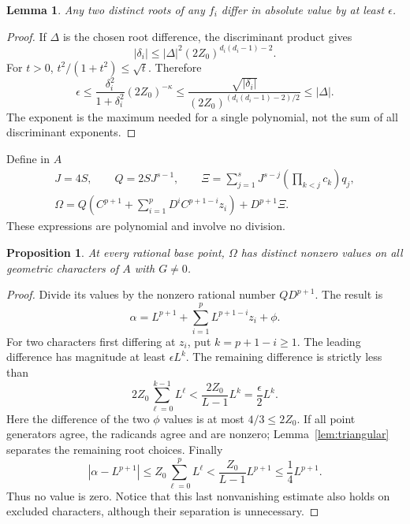 \documentclass[11pt,a4paper]{article}
\newtheorem{lemma}[theorem]{Lemma}
\newtheorem{proposition}[theorem]{Proposition}
\begin{document}
\begin{lemma}\label{lem:pointsep}
Any two distinct roots of any $f_i$ differ in absolute value by at least
$\epsilon$.
\end{lemma}
\begin{proof}
If $\Delta$ is the chosen root difference, the discriminant product gives
\[
 |\delta_i|\le |\Delta|^2(2Z_0)^{d_i(d_i-1)-2}.
\]
For $t>0$, $t^2/(1+t^2)\le\sqrt t$. Therefore
\[
 \epsilon\le \frac{\delta_i^2}{1+\delta_i^2}(2Z_0)^{-\kappa}
 \le\frac{\sqrt{|\delta_i|}}
 {(2Z_0)^{(d_i(d_i-1)-2)/2}}\le|\Delta|.
\]
The exponent is the maximum needed for a single polynomial, not the sum
of all discriminant exponents.
\end{proof}

Define in $A$
\begin{gather*}
 J=4S,\qquad Q=2S J^{s-1},\qquad
 \Xi=\sum_{j=1}^sJ^{s-j}\left(\prod_{k<j}c_k\right)q_j,\\
 \Omega=Q\left(C^{p+1}+\sum_{i=1}^pD^iC^{p+1-i}z_i\right)+D^{p+1}\Xi.
\end{gather*}
These expressions are polynomial and involve no division.

\begin{proposition}\label{prop:sep}
At every rational base point, $\Omega$ has distinct nonzero values on all
geometric characters of $A$ with $G\ne0$.
\end{proposition}
\begin{proof}
Divide its values by the nonzero rational number $QD^{p+1}$. The result is
\[
 \alpha=L^{p+1}+\sum_{i=1}^pL^{p+1-i}z_i+\phi.
\]
For two characters first differing at $z_i$, put $k=p+1-i\ge1$.
The leading difference has magnitude at least $\epsilon L^k$.
The remaining difference is strictly less than
\[
 2Z_0\sum_{\ell=0}^{k-1}L^\ell
 <\frac{2Z_0}{L-1}L^k=\frac\epsilon2L^k.
\]
Here the difference of the two $\phi$ values is at most $4/3\le2Z_0$.
If all point generators agree, the radicands agree and are nonzero;
Lemma~\ref{lem:triangular} separates the remaining root choices.
Finally
\[
 |\alpha-L^{p+1}|\le Z_0\sum_{\ell=0}^pL^\ell
 <\frac{Z_0}{L-1}L^{p+1}\le\frac14L^{p+1}.
\]
Thus no value is zero. Notice that this last nonvanishing estimate also
holds on excluded characters, although their separation is unnecessary.
\end{proof}
\end{document}
